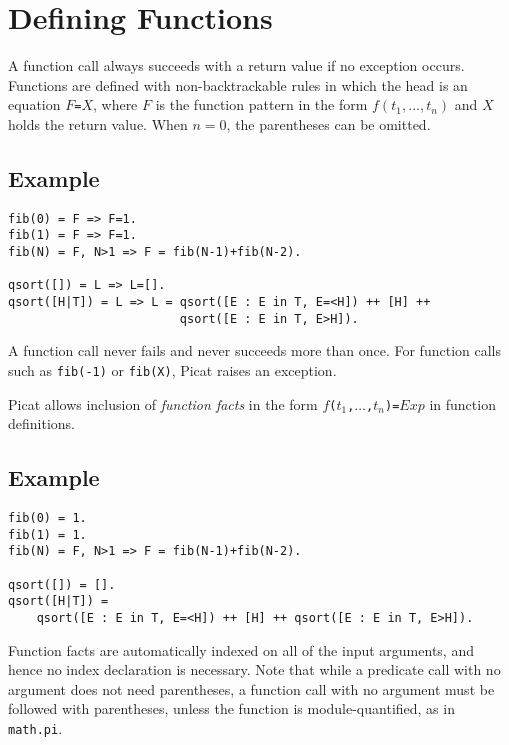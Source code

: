 \section{Defining Functions}
A function call always succeeds with a return value if no exception occurs. Functions are defined with non-backtrackable rules in which the head is an equation $F$\verb+=+$X$, where $F$ is the function pattern in the form $f(t_1,\ldots, t_n)$ and $X$ holds the return value. When $n=0$, the parentheses can be omitted.

\subsection*{Example}
\begin{verbatim}
fib(0) = F => F=1.
fib(1) = F => F=1.
fib(N) = F, N>1 => F = fib(N-1)+fib(N-2).

qsort([]) = L => L=[].
qsort([H|T]) = L => L = qsort([E : E in T, E=<H]) ++ [H] ++
                        qsort([E : E in T, E>H]).
\end{verbatim}
A function call never fails and never succeeds more than once. For function calls such as \texttt{fib(-1)} or \texttt{fib(X)}, Picat raises an exception. 

Picat allows inclusion of \emph{function facts} in the form {\tt $f$($t_1$,$\ldots$,$t_n$)\verb+=+$Exp$} in function definitions. 

\subsection*{Example}
\begin{verbatim}
fib(0) = 1.    
fib(1) = 1.
fib(N) = F, N>1 => F = fib(N-1)+fib(N-2).

qsort([]) = [].
qsort([H|T]) =
    qsort([E : E in T, E=<H]) ++ [H] ++ qsort([E : E in T, E>H]).
\end{verbatim}
Function facts are automatically indexed on all of the input arguments, and hence no index declaration is necessary. Note that while a predicate call with no argument does not need parentheses, a function call with no argument must be followed with parentheses, unless the function is module-quantified, as in \texttt{math.pi}.

